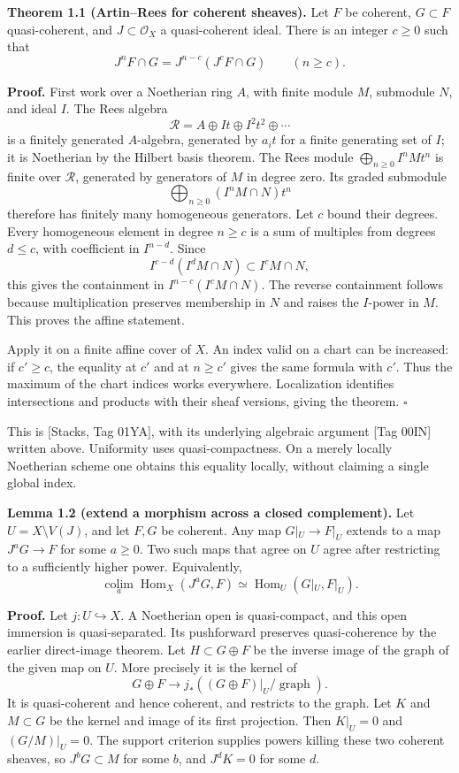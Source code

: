 \documentclass[11pt]{article}
\begin{document}
\textbf{Theorem 1.1 (Artin--Rees for coherent sheaves).} Let \(F\) be
coherent, \(G\subset F\) quasi-coherent, and \(J\subset\mathcal O_X\) a
quasi-coherent ideal. There is an integer \(c\ge0\) such that \[
J^nF\cap G=J^{n-c}(J^cF\cap G)\qquad(n\ge c).
\]

\textbf{Proof.} First work over a Noetherian ring \(A\), with finite
module \(M\), submodule \(N\), and ideal \(I\). The Rees algebra \[
\mathcal R=A\oplus It\oplus I^2t^2\oplus\cdots
\] is a finitely generated \(A\)-algebra, generated by \(a_it\) for a
finite generating set of \(I\); it is Noetherian by the Hilbert basis
theorem. The Rees module \(\bigoplus_{n\ge0}I^nM t^n\) is finite over
\(\mathcal R\), generated by generators of \(M\) in degree zero. Its
graded submodule \[
\bigoplus_{n\ge0}(I^nM\cap N)t^n
\] therefore has finitely many homogeneous generators. Let \(c\) bound
their degrees. Every homogeneous element in degree \(n\ge c\) is a sum
of multiples from degrees \(d\le c\), with coefficient in \(I^{n-d}\).
Since \[
I^{c-d}(I^dM\cap N)\subset I^cM\cap N,
\] this gives the containment in \(I^{n-c}(I^cM\cap N)\). The reverse
containment follows because multiplication preserves membership in \(N\)
and raises the \(I\)-power in \(M\). This proves the affine statement.

Apply it on a finite affine cover of \(X\). An index valid on a chart
can be increased: if \(c'\ge c\), the equality at \(c'\) and at
\(n\ge c'\) gives the same formula with \(c'\). Thus the maximum of the
chart indices works everywhere. Localization identifies intersections
and products with their sheaf versions, giving the theorem. \(\square\)

This is {[}Stacks, Tag 01YA{]}, with its underlying algebraic argument
{[}Tag 00IN{]} written above. Uniformity uses quasi-compactness. On a
merely locally Noetherian scheme one obtains this equality locally,
without claiming a single global index.

\textbf{Lemma 1.2 (extend a morphism across a closed complement).} Let
\(U=X\setminus V(J)\), and let \(F,G\) be coherent. Any map
\(G|_U\to F|_U\) extends to a map \(J^aG\to F\) for some \(a\ge0\). Two
such maps that agree on \(U\) agree after restricting to a sufficiently
higher power. Equivalently, \[
\underset{a}{\operatorname{colim}}\operatorname{Hom}_X(J^aG,F)
\simeq\operatorname{Hom}_U(G|_U,F|_U).
\]

\textbf{Proof.} Let \(j:U\hookrightarrow X\). A Noetherian open is
quasi-compact, and this open immersion is quasi-separated. Its
pushforward preserves quasi-coherence by the earlier direct-image
theorem. Let \(H\subset G\oplus F\) be the inverse image of the graph of
the given map on \(U\). More precisely it is the kernel of \[
G\oplus F\longrightarrow j_*((G\oplus F)|_U/\operatorname{graph}).
\] It is quasi-coherent and hence coherent, and restricts to the graph.
Let \(K\) and \(M\subset G\) be the kernel and image of its first
projection. Then \(K|_U=0\) and \((G/M)|_U=0\). The support criterion
supplies powers killing these two coherent sheaves, so \(J^bG\subset M\)
for some \(b\), and \(J^dK=0\) for some \(d\).
\end{document}
